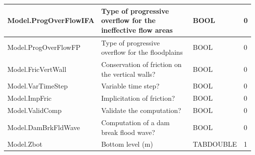 \documentclass[a4paper,11pt]{article}
\begin{document}
\begin{landscape}
\begin{table}[ht]
\begin{center}
\begin{tabular}{|l|l|l|l|}
\hline  Model.ProgOverFlowIFA & Type of progressive overflow for the ineffective flow areas & BOOL & 0 \\
\hline  Model.ProgOverFlowFP & Type of progressive overflow for the floodplains & BOOL & 0 \\
\hline  Model.FricVertWall & Conservation of friction on the vertical walls? & BOOL & 0 \\
\hline  Model.VarTimeStep & Variable time step? & BOOL & 0 \\
\hline  Model.ImpFric & Implicitation of friction? & BOOL & 0 \\
\hline  Model.ValidComp & Validate the computation? & BOOL & 0 \\
\hline  Model.DamBrkFldWave & Computation of a dam break flood wave? & BOOL & 0 \\
\hline  Model.Zbot & Bottom level (m) & TABDOUBLE & 1 \\
\hline

\end{tabular} 
\end{center}
\end{table}
\begin{table}[ht]
\begin{center}
\begin{tabular}{|l|l|l|l|}


\end{tabular}
\end{center}
\end{table}
\end{landscape}
\end{document}
